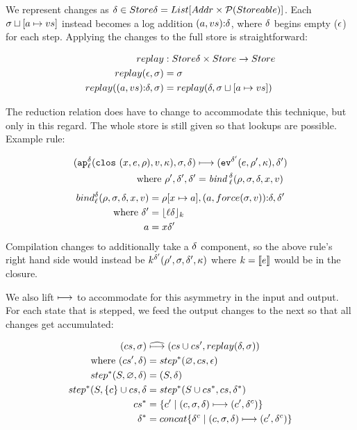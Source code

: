 \documentclass[preprint,onecolumn,9pt]{sigplanconf} %
\begin{document}
We represent changes as $\msdiff \in Store\msdiff = List[Addr \times
  \Set(Storeable)]$. Each $\msto\sqcup[\maddr \mapsto \mval{s}]$
instead becomes a log addition
$\cons{\ttuple{\maddr}{\mval{s}}}{\msdiff}$, where $\msdiff$ begins
empty ($\mtlst$) for each step. Applying the changes to the full store
is straightforward:

\begin{align*}
replay &: Store\msdiff \times Store \to Store \\
replay(\mtlst, \msto) &= \msto \\
replay(\cons{\ttuple{\maddr}{\mval{s}}}{\msdiff}, \msto) &= replay(\msdiff, \msto\sqcup[\maddr \mapsto \mval{s}])
\end{align*}

The reduction relation does have to change to accommodate this
technique, but only in this regard. The whole store is still given so
that lookups are possible. Example rule:

\begin{align*}
(\ap[^\mcntr_\mlab]{\clos{\mvar,\mexp,\menv},\mval,\mkont},\msto,\msdiff) & \machstep
(\ev[^{\mcntr'}]{\mexp,\menv',\mkont},\msdiff') \\
\text{ where }\menv',\msdiff',\mcntr' &= \mathit{bind\,}^{ \mcntr}_\mlab(\menv,\msto,\msdiff,\mvar,\mval)
\end{align*}
\begin{align*}
bind^{\mcntr}_\mlab(\menv, \msto, \msdiff, \mvar, \mval) &= \menv[\mvar \mapsto \maddr], \cons{\ttuple{\maddr}{force(\msto,\mval)}}{\msdiff}, \mcntr' \\
\text{ where } \mcntr' &= \lfloor \mlab \mcntr\rfloor_k \\
               \maddr &= \mvar\mcntr'
\end{align*}
Compilation changes to additionally take a $\msdiff$ component, so the
above rule's right hand side would instead be $k^{\mcntr'}(\menv',
\msto, \msdiff', \mkont)$ where $k = \compile{e}$ would be in the closure.

We also lift $\machstep$ to accommodate for this asymmetry
in the input and output. For each state that is stepped, we feed the
output changes to the next so that all changes get accumulated:

\begin{align*}
(cs, \msto) &\mathrel{\widehat{\machstep}} (cs\cup cs', replay(\msdiff,\msto)) \\
\mbox{ where } (cs', \msdiff) &= step^*(\varnothing, cs, \mtlst) \\
step^*(S, \varnothing, \msdiff) &= (S, \msdiff) \\
step^*(S, \{c\}\cup cs, \msdiff &= step^*(S\cup cs^*, cs, \msdiff^*) \\
cs^* &= \{c' \mid (c,\msto,\msdiff) \machstep (c',\msdiff^c) \} \\
\msdiff^* &= concat\{\msdiff^c \mid (c, \msto,\msdiff) \machstep (c', \msdiff^c)\}
\end{align*}
\end{document}
